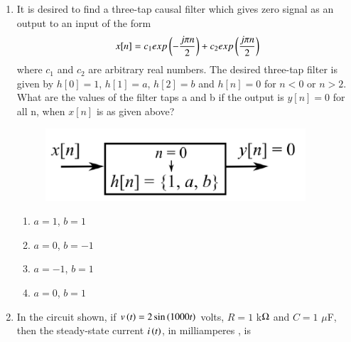 \documentclass[a4paper, 11pt]{article}
\begin{document}
\begin{enumerate}
    \begin{enumerate}
    \end{enumerate}
    
    \hfill{}

    \item It is desired to find a three-tap causal filter which gives zero signal as an output to an input of the form
    \[
    x[n]=c_{1}exp\left(-\frac{j\pi n}{2}\right)+c_{2}exp\left(\frac{j\pi n}{2}\right)
    \]
    where $c_{1}$ and $c_{2}$ are arbitrary real numbers. The desired three-tap filter is given by
    $h[0]=1$, $h[1]=a$, $h[2]=b$ and $h[n]=0$ for $n<0$ or $n>2$. What are the values of the filter taps a and b if the output is $y[n]=0$ for all n, when $x[n]$ is as given above?
    
    \begin{figure}[H]
        \centering
        \includegraphics[width=0.7\columnwidth]{figs/q29.png}
        \caption*{}
        \label{fig:q29}
    \end{figure}

    \begin{enumerate}
        \item $a=1$, $b=1$
        \item $a=0$, $b=-1$
        \item $a=-1$, $b=1$
        \item $a=0$, $b=1$
    \end{enumerate}
    
    \hfill{}
    
    \item In the circuit shown, if $v\left(t\right)=2 \sin\left(1000 t\right)$ volts, $R=1$ k$\ohm$ and $C=1$ $\mu$F, then the steady-state current $i\left(t\right)$, in milliamperes , is
    

\end{enumerate}
\end{document}
